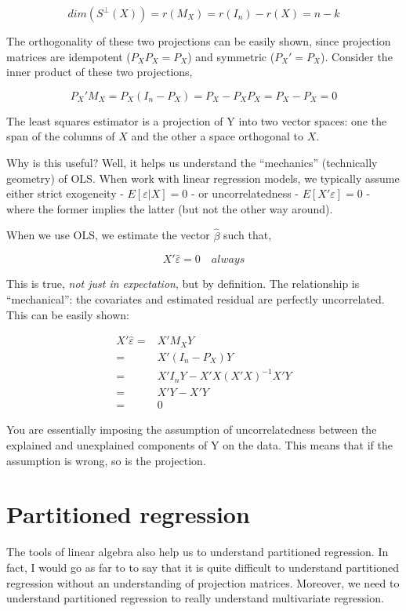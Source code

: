 \documentclass[
  letterpaper,
  DIV=11,
  numbers=noendperiod]{scrreprt}
\begin{document}
\[
dim(S^{\perp}(X)) = r(M_X) = r(I_n)-r(X) = n-k
\]

The orthogonality of these two projections can be easily shown, since
projection matrices are idempotent (\(P_XP_X = P_X\)) and symmetric
(\(P_X' = P_X\)). Consider the inner product of these two projections,

\[
P_X'M_X = P_X(I_n-P_X) = P_X-P_XP_X = P_X-P_X = 0
\]

The least squares estimator is a projection of Y into two vector spaces:
one the span of the columns of \(X\) and the other a space orthogonal to
\(X\).

Why is this useful? Well, it helps us understand the ``mechanics''
(technically geometry) of OLS. When work with linear regression models,
we typically assume either strict exogeneity - \(E[\varepsilon|X]=0\) -
or uncorrelatedness - \(E[X'\varepsilon]=0\) - where the former implies
the latter (but not the other way around).

When we use OLS, we estimate the vector \(\hat{\beta}\) such that,

\[
X'\hat{\varepsilon}=0 \quad always
\]

This is true, \emph{not just in expectation}, but by definition. The
relationship is ``mechanical'': the covariates and estimated residual
are perfectly uncorrelated. This can be easily shown:

\[
\begin{align}
X'\hat{\varepsilon} =& X'M_XY \\
=& X'(I_n-P_X)Y \\
=&X'I_nY-X'X(X'X)^{-1}X'Y \\
=&X'Y-X'Y \\
=&0
\end{align}
\]

You are essentially imposing the assumption of uncorrelatedness between
the explained and unexplained components of Y on the data. This means
that if the assumption is wrong, so is the projection.

\hypertarget{partitioned-regression}{%
\section{Partitioned regression}\label{partitioned-regression}}

The tools of linear algebra also help us to understand partitioned
regression. In fact, I would go as far to to say that it is quite
difficult to understand partitioned regression without an understanding
of projection matrices. Moreover, we need to understand partitioned
regression to really understand multivariate regression.
\end{document}

